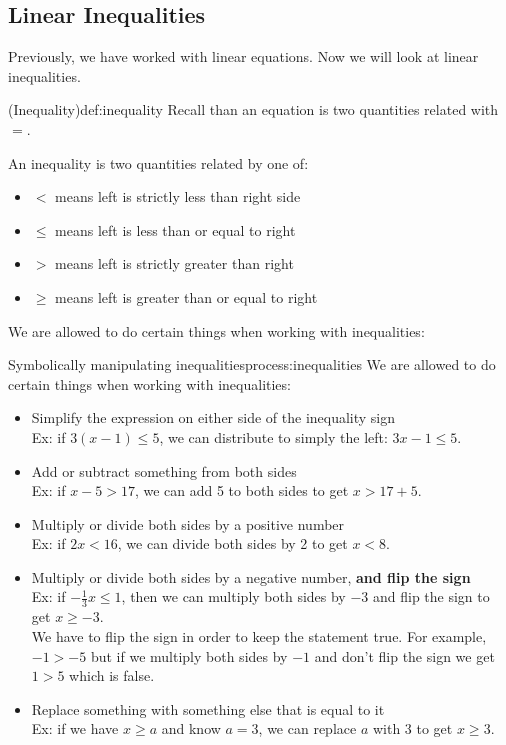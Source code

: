 \documentclass{article}
\begin{document}
\setcounter{section}{2}
\setcounter{subsection}{2}

\subsection{Linear Inequalities}

Previously, we have worked with linear equations. Now we will look at linear inequalities.

\begin{definition}{(Inequality)}{def:inequality}
    Recall than an equation is two quantities related with $=$.

    An inequality is two quantities related by one of:
    \begin{itemize}
        \item $<$ means left is strictly less than right side
        \item $\leq$ means left is less than or equal to right
        \item $>$ means left is strictly greater than right
        \item $\geq$ means left is greater than or equal to right
    \end{itemize}
\end{definition}

We are allowed to do certain things when working with inequalities:

\begin{process}{Symbolically manipulating inequalities}{process:inequalities}
    We are allowed to do certain things when working with inequalities:
    \begin{itemize}
        \item Simplify the expression on either side of the inequality sign\\Ex: if $3(x-1)\leq 5$, we can distribute to simply the left: $3x-1\leq 5$.
        \item Add or subtract something from both sides\\Ex: if $x-5>17$, we can add 5 to both sides to get $x>17+5$.
        \item Multiply or divide both sides by a positive number\\Ex: if $2x<16$, we can divide both sides by 2 to get $x<8$.
        \item Multiply or divide both sides by a negative number, {\bf and flip the sign}\\Ex: if $-\frac{1}{3}x\leq 1$, then we can multiply both sides by $-3$ and flip the sign to get $x\geq -3$.\\We have to flip the sign in order to keep the statement true. For example, $-1>-5$ but if we multiply both sides by $-1$ and don't flip the sign we get $1>5$ which is false.
        \item Replace something with something else that is equal to it\\Ex: if we have $x \geq a$ and know $a=3$, we can replace $a$ with $3$ to get $x\geq3$.
    \end{itemize}
\end{process}
\end{document}
